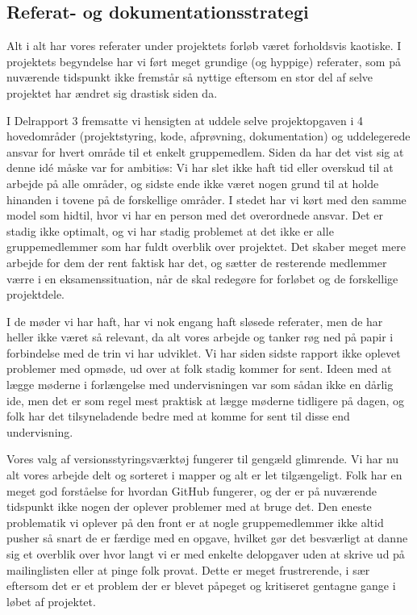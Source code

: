 \documentclass[10pt,a4paper,danish]{article}
\begin{document}
\subsection{Referat- og dokumentationsstrategi}
Alt i alt har vores referater under projektets forløb været forholdsvis 
kaotiske. I projektets begyndelse har vi ført meget grundige (og hyppige)
referater, som på nuværende tidspunkt ikke fremstår så nyttige eftersom 
en stor del af selve projektet har ændret sig drastisk siden da. 

I Delrapport 3 fremsatte vi hensigten at uddele selve projektopgaven i 4 hovedområder
(projektstyring, kode, afprøvning, dokumentation) og uddelegerede ansvar for hvert 
område til et enkelt gruppemedlem. Siden da har det vist sig at denne idé måske var
for ambitiøs: Vi har slet ikke haft tid eller overskud til at arbejde på alle områder, 
og sidste ende ikke været nogen grund til at holde hinanden i tovene på de forskellige
områder. I stedet har vi kørt med den samme model som hidtil, hvor vi har en person med 
det overordnede ansvar. Det er stadig ikke optimalt, og vi har stadig problemet at det 
ikke er alle gruppemedlemmer som har fuldt overblik over projektet.
Det skaber meget mere arbejde for dem der rent faktisk har det,
og sætter de resterende medlemmer værre i en eksamenssituation, når de
skal redegøre for forløbet og de forskellige projektdele.

I de møder vi har haft, har vi nok engang haft sløsede referater, men de har
heller ikke været så relevant, da alt vores arbejde og tanker røg ned på papir
i forbindelse med de trin vi har udviklet. Vi har
siden sidste rapport ikke oplevet problemer med opmøde, ud over at folk stadig
kommer for sent. Ideen med at lægge møderne i forlængelse med undervisningen
var som sådan ikke en dårlig ide, men det er som regel mest praktisk at lægge
møderne tidligere på dagen, og folk har det tilsyneladende bedre med at komme
for sent til disse end undervisning. 

Vores valg af versionsstyringsværktøj fungerer til gengæld glimrende. Vi har nu alt vores
arbejde delt og sorteret i mapper og alt er let tilgængeligt. Folk har en meget
god forståelse for hvordan GitHub fungerer, og der er på nuværende tidspunkt ikke
nogen der oplever problemer med at bruge det. Den eneste problematik vi oplever 
på den front er at nogle gruppemedlemmer ikke altid pusher så snart de er færdige 
med en opgave, hvilket gør det besværligt at danne sig et overblik over hvor langt 
vi er med enkelte delopgaver uden at skrive ud på mailinglisten eller at pinge folk
provat. Dette er meget frustrerende, i sær eftersom det er et problem der er blevet
påpeget og kritiseret gentagne gange i løbet af projektet. 
\end{document}
